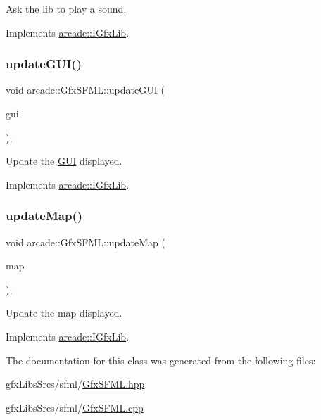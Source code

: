Ask the lib to play a sound. 



Implements \hyperlink{classarcade_1_1_i_gfx_lib_a0b965ed555739ef366b27583799d794c}{arcade\+::\+I\+Gfx\+Lib}.

\mbox{\label{classarcade_1_1_gfx_s_f_m_l_ad8ba0c70b00c4132010ceabc2246bb59}} 
\subsubsection{\texorpdfstring{update\+G\+U\+I()}{updateGUI()}}
{\footnotesize\ttfamily void arcade\+::\+Gfx\+S\+F\+M\+L\+::update\+G\+UI (\begin{DoxyParamCaption}\item[{\hyperlink{classarcade_1_1_i_g_u_i}{I\+G\+UI} \&}]{gui }\end{DoxyParamCaption})\hspace{0.3cm}{\ttfamily [override]}, {\ttfamily [virtual]}}



Update the \hyperlink{classarcade_1_1_g_u_i}{G\+UI} displayed. 



Implements \hyperlink{classarcade_1_1_i_gfx_lib_ae3f443cc341512433815e8bf2dee3e0d}{arcade\+::\+I\+Gfx\+Lib}.

\mbox{\label{classarcade_1_1_gfx_s_f_m_l_ad21d26a1e549e2da25da1c9f4155151c}} 
\subsubsection{\texorpdfstring{update\+Map()}{updateMap()}}
{\footnotesize\ttfamily void arcade\+::\+Gfx\+S\+F\+M\+L\+::update\+Map (\begin{DoxyParamCaption}\item[{\hyperlink{classarcade_1_1_i_map}{I\+Map} const \&}]{map }\end{DoxyParamCaption})\hspace{0.3cm}{\ttfamily [override]}, {\ttfamily [virtual]}}



Update the map displayed. 



Implements \hyperlink{classarcade_1_1_i_gfx_lib_addc883f69b75e6ec4927027aad94f5b5}{arcade\+::\+I\+Gfx\+Lib}.



The documentation for this class was generated from the following files\+:\begin{DoxyCompactItemize}
\item 
gfx\+Libs\+Srcs/sfml/\hyperlink{_gfx_s_f_m_l_8hpp}{Gfx\+S\+F\+M\+L.\+hpp}\item 
gfx\+Libs\+Srcs/sfml/\hyperlink{_gfx_s_f_m_l_8cpp}{Gfx\+S\+F\+M\+L.\+cpp}\end{DoxyCompactItemize}
